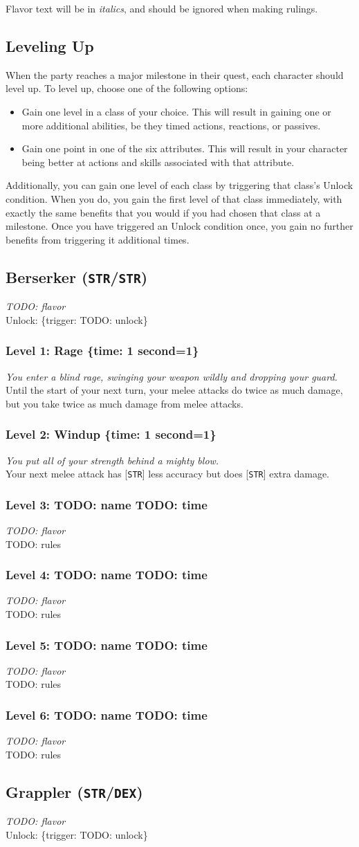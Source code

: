 \documentclass[12pt]{article}
\newcommand{\STR}{\texttt{STR}}
\newcommand{\DEX}{\texttt{DEX}}
\newcommand{\TIME}[1]{\{time: #1 second\if1=#1{}\else{s}\fi\}}
\newcommand{\TRIG}[1]{\{trigger: #1\}}
\newcommand{\Class}[4]{\pagebreak\subsection{#1 (#2)}\label{#1}\textit{#3}\\[1mm]Unlock: \TRIG{#4}}
\newcommand{\Skill}[5]{\subsubsection{Level #1: #2 #3}\textit{#4}\\[1mm]#5}
\begin{document}
Flavor text will be in \textit{italics}, and should be ignored when making rulings.

\subsection{Leveling Up}

When the party reaches a major milestone in their quest, each character should level up. To level up, choose one of the following options:
\begin{itemize}
\item Gain one level in a class of your choice. This will result in gaining one or more additional abilities, be they timed actions, reactions, or passives.
\item Gain one point in one of the six attributes. This will result in your character being better at actions and skills associated with that attribute.
\end{itemize}

Additionally, you can gain one level of each class by triggering that class's Unlock condition. When you do, you gain the first level of that class immediately, with exactly the same benefits that you would if you had chosen that class at a milestone. Once you have triggered an Unlock condition once, you gain no further benefits from triggering it additional times.

%

\Class{Berserker}{\STR/\STR}
{TODO: flavor}
{TODO: unlock}

\Skill{1}{Rage}{\TIME{1}}
{You enter a blind rage, swinging your weapon wildly and dropping your guard.}
{Until the start of your next turn, your melee attacks do twice as much damage, but you take twice as much damage from melee attacks.}

\Skill{2}{Windup}{\TIME{1}}
{You put all of your strength behind a mighty blow.}
{Your next melee attack has [\STR] less accuracy but does [\STR] extra damage.}

\Skill{3}{TODO: name}{TODO: time}
{TODO: flavor}
{TODO: rules}

\Skill{4}{TODO: name}{TODO: time}
{TODO: flavor}
{TODO: rules}

\Skill{5}{TODO: name}{TODO: time}
{TODO: flavor}
{TODO: rules}

\Skill{6}{TODO: name}{TODO: time}
{TODO: flavor}
{TODO: rules}

%

\Class{Grappler}{\STR/\DEX}
{TODO: flavor}
{TODO: unlock}
\end{document}
